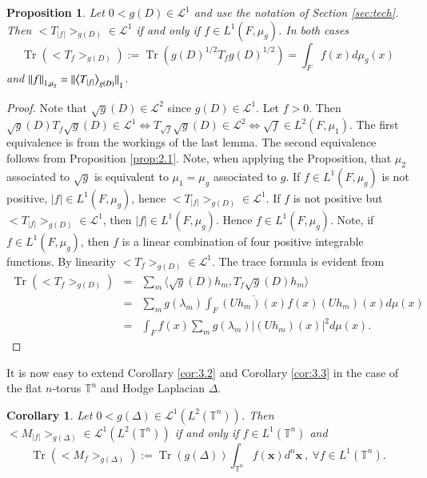\documentclass[final,1p]{elsarticle}
\numberwithin{equation}{section}
\theoremstyle{plain}
\newtheorem{prop}[thm]{Proposition}
\newtheorem{cor}[thm]{Corollary}
\theoremstyle{definition}
\newcounter{prop2count}
\begin{document}
\begin{prop} \label{prop:4.1}
Let $0 < g(D) \in \mathcal{L}^1$ and use the notation of Section \ref{sec:tech}.  Then ${\ensuremath{\big< {T_{|f|}} \big>_{{g(D)}}}} \in \mathcal{L}^1$ if and only if $f \in L^1(F,\mu_g)$.  In both cases 
$$
\operatorname{Tr}({\ensuremath{\big< {T_f} \big>_{{g(D)}}}}) := \operatorname{Tr}(g(D)^{1/2} T_f g(D)^{1/2}) = \int_F f(x) d\mu_{g}(x)
$$
and ${\mbox{\ensuremath{\| {f} \|}}}_{1,\mu_g} = {\mbox{\ensuremath{\| {{\ensuremath{\big< {T_{|f|}} \big>_{{g(D)}}}}} \|}}}_1$.
\end{prop}
\begin{proof}
Note that $\sqrt{g}(D) \in \mathcal{L}^2$ since $g(D) \in \mathcal{L}^1$.  Let $f > 0$.
Then $\sqrt{g}(D) T_{f} \sqrt{g}(D) \in \mathcal{L}^1 \Leftrightarrow 
T_{\sqrt{f}} \sqrt{g}(D) \in \mathcal{L}^2 \Leftrightarrow \sqrt{f} \in L^2(F,\mu_1)$.  The first equivalence is from the workings of the last lemma.  The second equivalence follows from Proposition
\ref{prop:2.1}.  Note, when applying the Proposition, that $\mu_{2}$ associated to $\sqrt{g}$ is equivalent to $\mu_1 = \mu_g$ associated to $g$.
If $f \in L^1(F,\mu_g)$ is not positive, $|f| \in L^1(F,\mu_g)$, hence ${\ensuremath{\big< {T_{|f|}} \big>_{{g(D)}}}} \in \mathcal{L}^1$.  If $f$ is not
positive but ${\ensuremath{\big< {T_{|f|}} \big>_{{g(D)}}}} \in \mathcal{L}^1$, then $|f| \in L^1(F,\mu_g)$.  Hence $f \in L^1(F,\mu_g)$.  Note, if $f \in L^1(F,\mu_g)$, then $f$ is a linear combination of
four positive integrable functions.  By linearity ${\ensuremath{\big< {T_{f}} \big>_{{g(D)}}}} \in \mathcal{L}^1$.
The trace formula is evident from 
\begin{eqnarray*}
\operatorname{Tr}({\ensuremath{\big< {T_f} \big>_{{g(D)}}}}) & = & \sum_m {\ensuremath{\langle {\sqrt{g}(D) h_m} , {T_f \sqrt{g}(D)h_m} \rangle}} \\
& = & \sum_m g(\lambda_m) \int_F \overline{(Uh_m)(x)} f(x) (Uh_m)(x) d\mu(x) \\
& = & \int_F f(x) \sum_m g(\lambda_m) |(Uh_m)(x)|^2 d\mu(x) .
\end{eqnarray*}
\end{proof}

It is now easy to extend Corollary \ref{cor:3.2} and Corollary \ref{cor:3.3}
in the case of the flat $n$-torus ${\ensuremath{\mathbb{T}}}^n$ and Hodge Laplacian $\Delta$.

\begin{cor} \label{cor:4.2}
Let $0 < g(\Delta) \in \mathcal{L}^1(L^2({\ensuremath{\mathbb{T}}}^n))$.  Then ${\ensuremath{\big< {M_{|f|}} \big>_{{g(\Delta)}}}} \in \mathcal{L}^1(L^2({\ensuremath{\mathbb{T}}}^n))$ if and only if $f \in L^1({\ensuremath{\mathbb{T}}}^n)$ and
$$
\operatorname{Tr}({\ensuremath{\big< {M_f} \big>_{{g(\Delta)}}}}) := \operatorname{Tr}(g(\Delta)) \int_{{\ensuremath{\mathbb{T}}}^n} f(\mathbf{x}) d^n \mathbf{x} \ , \ {\ensuremath{\forall}} f \in L^1({\ensuremath{\mathbb{T}}}^n) .
$$
\end{cor}
\end{document}
